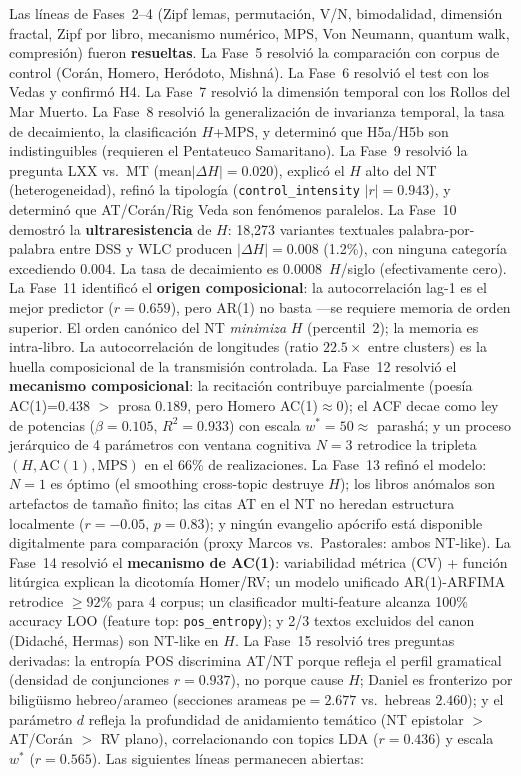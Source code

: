 \documentclass[12pt,a4paper]{article}
\begin{document}
\noindent
Las l\'ineas de Fases~2--4 (Zipf lemas, permutaci\'on, V/N, bimodalidad,
dimensi\'on fractal, Zipf por libro, mecanismo num\'erico,
MPS, Von Neumann, quantum walk, compresi\'on) fueron \textbf{resueltas}.
La Fase~5 resolvi\'o la comparaci\'on con corpus de control (Cor\'an, Homero,
Her\'odoto, Mishn\'a). La Fase~6 resolvi\'o el test con los Vedas y confirm\'o H4.
La Fase~7 resolvi\'o la dimensi\'on temporal con los Rollos del Mar Muerto.
La Fase~8 resolvi\'o la generalizaci\'on de invarianza temporal, la tasa de
decaimiento, la clasificaci\'on $H$+MPS, y determin\'o que H5a/H5b son
indistinguibles (requieren el Pentateuco Samaritano).
La Fase~9 resolvi\'o la pregunta LXX vs.\ MT (mean$|\Delta H| = 0.020$),
explic\'o el $H$ alto del NT (heterogeneidad), refin\'o la tipolog\'ia
(\texttt{control\_intensity} $|r|=0.943$), y determin\'o que AT/Cor\'an/Rig Veda
son fen\'omenos paralelos.
La Fase~10 demostr\'o la \textbf{ultraresistencia} de $H$: 18,273 variantes
textuales palabra-por-palabra entre DSS y WLC producen $|\Delta H| = 0.008$
(1.2\%), con ninguna categor\'ia excediendo 0.004. La tasa de decaimiento
es $0.0008$~$H$/siglo (efectivamente cero).
La Fase~11 identific\'o el \textbf{origen composicional}: la autocorrelaci\'on lag-1
es el mejor predictor ($r = 0.659$), pero AR(1) no basta ---se requiere memoria
de orden superior. El orden can\'onico del NT \emph{minimiza} $H$ (percentil~2);
la memoria es intra-libro. La autocorrelaci\'on de longitudes (ratio $22.5\times$
entre clusters) es la huella composicional de la transmisi\'on controlada.
La Fase~12 resolvi\'o el \textbf{mecanismo composicional}: la recitaci\'on contribuye
parcialmente (poes\'ia AC(1)=$0.438$ $>$ prosa $0.189$, pero Homero AC(1)$\approx 0$);
el ACF decae como ley de potencias ($\beta = 0.105$, $R^2 = 0.933$) con escala
$w^* = 50 \approx$ parash\'a; y un proceso jer\'arquico de 4 par\'ametros con
ventana cognitiva $N = 3$ retrodice la tripleta $(H, \text{AC}(1), \text{MPS})$
en el 66\% de realizaciones.
La Fase~13 refin\'o el modelo: $N = 1$ es \'optimo (el smoothing cross-topic destruye $H$);
los libros an\'omalos son artefactos de tama\~no finito;
las citas AT en el NT no heredan estructura localmente ($r = -0.05$, $p = 0.83$);
y ning\'un evangelio ap\'ocrifo est\'a disponible digitalmente para comparaci\'on
(proxy Marcos vs.\ Pastorales: ambos NT-like).
La Fase~14 resolvi\'o el \textbf{mecanismo de AC(1)}: variabilidad m\'etrica (CV) +
funci\'on lit\'urgica explican la dicotom\'ia Homer/RV; un modelo unificado AR(1)-ARFIMA
retrodice $\geq 92$\% para 4 corpus; un clasificador multi-feature alcanza 100\%
accuracy LOO (feature top: \texttt{pos\_entropy}); y 2/3 textos excluidos del canon
(Didach\'e, Hermas) son NT-like en $H$.
La Fase~15 resolvi\'o tres preguntas derivadas: la entrop\'ia POS discrimina AT/NT
porque refleja el perfil gramatical (densidad de conjunciones $r = 0.937$), no
porque cause $H$; Daniel es fronterizo por bilig\"uismo hebreo/arameo (secciones
arameas $\text{pe} = 2.677$ vs.\ hebreas $2.460$); y el par\'ametro $d$ refleja la
profundidad de anidamiento tem\'atico (NT epistolar $> $ AT/Cor\'an $>$ RV plano),
correlacionando con topics LDA ($r = 0.436$) y escala $w^*$ ($r = 0.565$).
Las siguientes l\'ineas permanecen abiertas:
\end{document}
